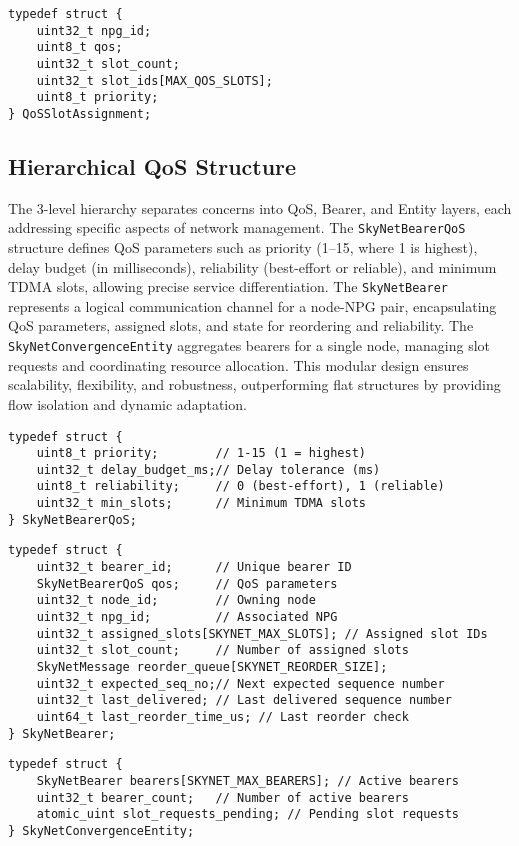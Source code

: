 \documentclass{article}
\begin{document}
\begin{lstlisting}
typedef struct {
    uint32_t npg_id;
    uint8_t qos;
    uint32_t slot_count;
    uint32_t slot_ids[MAX_QOS_SLOTS];
    uint8_t priority;
} QoSSlotAssignment;
\end{lstlisting}

\subsection{Hierarchical QoS Structure}
The 3-level hierarchy separates concerns into QoS, Bearer, and Entity layers, each addressing
specific aspects of network management. The \texttt{SkyNetBearerQoS} structure defines QoS
parameters such as priority (1--15, where 1 is highest), delay budget (in milliseconds), reliability
(best-effort or reliable), and minimum TDMA slots, allowing precise service differentiation. The
\texttt{SkyNetBearer} represents a logical communication channel for a node-NPG pair, encapsulating
QoS parameters, assigned slots, and state for reordering and reliability. The
\texttt{SkyNetConvergenceEntity} aggregates bearers for a single node, managing slot requests and
coordinating resource allocation. This modular design ensures scalability, flexibility, and
robustness, outperforming flat structures by providing flow isolation and dynamic adaptation.

\begin{lstlisting}
typedef struct {
    uint8_t priority;        // 1-15 (1 = highest)
    uint32_t delay_budget_ms;// Delay tolerance (ms)
    uint8_t reliability;     // 0 (best-effort), 1 (reliable)
    uint32_t min_slots;      // Minimum TDMA slots
} SkyNetBearerQoS;
\end{lstlisting}

\begin{lstlisting}
typedef struct {
    uint32_t bearer_id;      // Unique bearer ID
    SkyNetBearerQoS qos;     // QoS parameters
    uint32_t node_id;        // Owning node
    uint32_t npg_id;         // Associated NPG
    uint32_t assigned_slots[SKYNET_MAX_SLOTS]; // Assigned slot IDs
    uint32_t slot_count;     // Number of assigned slots
    SkyNetMessage reorder_queue[SKYNET_REORDER_SIZE];
    uint32_t expected_seq_no;// Next expected sequence number
    uint32_t last_delivered; // Last delivered sequence number
    uint64_t last_reorder_time_us; // Last reorder check
} SkyNetBearer;
\end{lstlisting}

\begin{lstlisting}
typedef struct {
    SkyNetBearer bearers[SKYNET_MAX_BEARERS]; // Active bearers
    uint32_t bearer_count;   // Number of active bearers
    atomic_uint slot_requests_pending; // Pending slot requests
} SkyNetConvergenceEntity;
\end{lstlisting}
\end{document}

